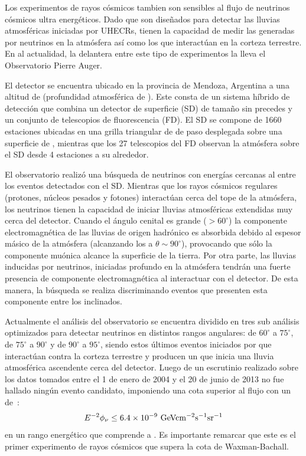 	Los experimentos de rayos c\'osmicos tambien son sensibles al flujo de neutrinos c\'osmicos ultra energ\'eticos. 
	Dado que son dise\~nados para detectar las lluvias atmosf\'ericas iniciadas por UHECRs, tienen la capacidad de medir las generadas por neutrinos en la atm\'osfera as\'i como los que interact\'uan en la corteza terrestre.
	En al actualidad, la delantera entre este tipo de experimentos la lleva el Observatorio Pierre Auger.
	
	El detector se encuentra ubicado en la provincia de Mendoza, Argentina a una altitud de  (profundidad atmosf\'erica de ).
	Este consta de un sistema h\'ibrido de detecci\'on que combina un detector de superficie (SD) de tama\~no sin precedes y un conjunto de telescopios de fluorescencia (FD).
	El SD se compone de 1660 estaciones \cher{} ubicadas en una grilla triangular de  de paso desplegada sobre una superficie de , mientras que los 27 telescopios del FD observan la atm\'osfera sobre el SD desde 4 estaciones a su alrededor.
	
	El observatorio realiz\'o una b\'usqueda de neutrinos con energ\'ias cercanas al  entre los eventos detectados con el SD.
	Mientras que los rayos c\'osmicos regulares (protones, n\'ucleos pesados y fotones) interact\'uan cerca del tope de la atm\'osfera, los neutrinos tienen la capacidad de iniciar lluvias atmosf\'ericas extendidas muy cerca del detector. 
	Cuando el \'angulo cenital es grande ($>60^\circ$) la componente electromagn\'etica de las lluvias de origen hadr\'onico es absorbida debido al espesor m\'asico de la atm\'osfera (alcanzando los  a $\theta\sim90^\circ$), provocando que s\'olo la componente mu\'onica alcance la superficie de la tierra.
	Por otra parte, las lluvias inducidas por neutrinos, iniciadas profundo en la atm\'osfera tendr\'an una fuerte presencia de componente electromagn\'etica al interactuar con el detector.
	De esta manera, la b\'usqueda se realiza discriminando eventos que presenten esta componente entre los inclinados. 
	
	Actualmente el an\'alisis del observatorio se encuentra dividido en tres sub an\'alisis optimizados para detectar neutrinos en distintos rangos angulares: de $60^\circ$ a $75^\circ$, de $75^\circ$ a $90^\circ$ y de $90^\circ$ a $95^\circ$, siendo estos \'ultimos eventos iniciados por \nutau{} que interact\'uan contra la corteza terrestre y producen un \tauon{} que inicia una lluvia atmosf\'erica ascendente cerca del detector.
	Luego de un escrutinio realizado sobre los datos tomados entre el 1 de enero de 2004 y el 20 de junio de 2013 no fue hallado ning\'un evento candidato, imponiendo una cota superior al flujo con un  de~\cite{Aab:2015kma}:
	\begin{equation}
	 E^{-2}\phi_\nu \leq 6.4\times10^{-9}{\rm\ GeVcm^{-2}s^{-1}sr^{-1}}
	\end{equation}
	en un rango energ\'etico que comprende  a .
	Es importante remarcar que este es el primer experimento de rayos c\'osmicos que supera la cota de Waxman-Bachall.
	
